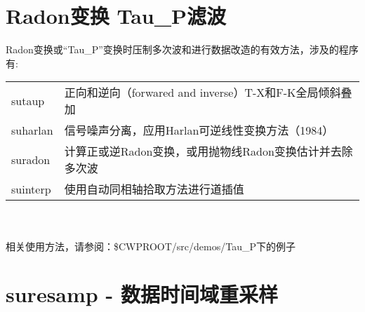 \section{Radon变换  Tau\_P滤波}
Radon变换或“Tau\_P”变换时压制多次波和进行数据改造的有效方法，涉及的程序有:\\
\begin{tabular}{lp{}}
	\toprule
	sutaup & 正向和逆向（forwared and inverse）T-X和F-K全局倾斜叠加\\
	suharlan & 信号噪声分离，应用Harlan可逆线性变换方法（1984）\\	
	suradon & 计算正或逆Radon变换，或用抛物线Radon变换估计并去除多次波	\\
	suinterp & 使用自动同相轴拾取方法进行道插值\\
	\bottomrule
\end{tabular}\\\\
相关使用方法，请参阅：\$CWPROOT/src/demos/Tau\_P下的例子

\section{suresamp - 数据时间域重采样}